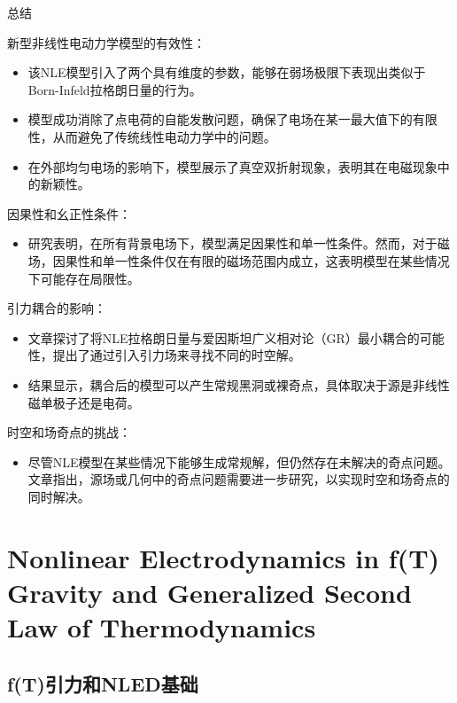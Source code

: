 \documentclass[9pt, dvipsnames]{beamer} %
\begin{document}
\begin{frame}{总结}

    新型非线性电动力学模型的有效性：
\begin{itemize}
    \item 该NLE模型引入了两个具有维度的参数，能够在弱场极限下表现出类似于Born-Infeld拉格朗日量的行为。

    \item 模型成功消除了点电荷的自能发散问题，确保了电场在某一最大值下的有限性，从而避免了传统线性电动力学中的问题。
    
    \item 在外部均匀电场的影响下，模型展示了真空双折射现象，表明其在电磁现象中的新颖性。
\end{itemize}

因果性和幺正性条件：

\begin{itemize}
    \item 研究表明，在所有背景电场下，模型满足因果性和单一性条件。然而，对于磁场，因果性和单一性条件仅在有限的磁场范围内成立，这表明模型在某些情况下可能存在局限性。
\end{itemize}

引力耦合的影响：

\begin{itemize}
    \item 文章探讨了将NLE拉格朗日量与爱因斯坦广义相对论（GR）最小耦合的可能性，提出了通过引入引力场来寻找不同的时空解。

    \item 结果显示，耦合后的模型可以产生常规黑洞或裸奇点，具体取决于源是非线性磁单极子还是电荷。
\end{itemize}


时空和场奇点的挑战：

\begin{itemize}
    \item 尽管NLE模型在某些情况下能够生成常规解，但仍然存在未解决的奇点问题。文章指出，源场或几何中的奇点问题需要进一步研究，以实现时空和场奇点的同时解决。
\end{itemize}
\end{frame}

\section{Nonlinear Electrodynamics in f(T) Gravity and Generalized Second Law of Thermodynamics}



\subsection{f(T)引力和NLED基础}
\end{document}
